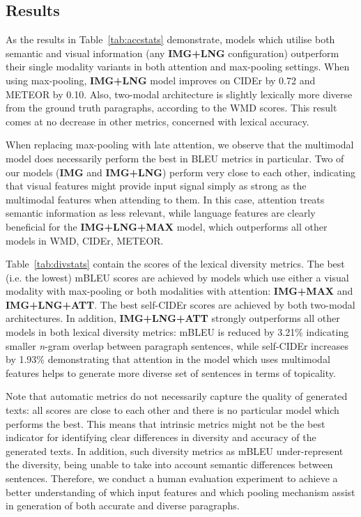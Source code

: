 \documentclass[11pt,a4paper]{article}
\begin{document}
\subsection{Results}

As the results in Table~\ref{tab:accstats} demonstrate, models which utilise both semantic and visual information (any \textbf{IMG+LNG} configuration) outperform their single modality variants in both attention and max-pooling settings.
When using max-pooling, \textbf{IMG+LNG} model improves on CIDEr by 0.72 and METEOR by 0.10.
Also, two-modal architecture is slightly lexically more diverse from the ground truth paragraphs, according to the WMD scores.
This result comes at no decrease in other metrics, concerned with lexical accuracy.

When replacing max-pooling with late attention, we observe that the multimodal model does necessarily perform the best in BLEU metrics in particular.
Two of our models (\textbf{IMG} and \textbf{IMG+LNG}) perform very close to each other, indicating that visual features might provide input signal simply as strong as the multimodal features when attending to them.
In this case, attention treats semantic information as less relevant, while language features are clearly beneficial for the \textbf{IMG+LNG+MAX} model, which outperforms all other models in WMD, CIDEr, METEOR.


Table~\ref{tab:divstats} contain the scores of the lexical diversity metrics. %
The best (i.e. the lowest) mBLEU scores are achieved by models which use either a visual modality with max-pooling or both modalities with attention: \textbf{IMG+MAX} and \textbf{IMG+LNG+ATT}.
The best self-CIDEr scores are achieved by both two-modal architectures.
In addition, \textbf{IMG+LNG+ATT} strongly outperforms all other models in both lexical diversity metrics: mBLEU is reduced by 3.21\% indicating smaller \textit{n}-gram overlap between paragraph sentences, while self-CIDEr increases by 1.93\% demonstrating that attention in the model which uses multimodal features helps to generate more diverse set of sentences in terms of topicality.

Note that automatic metrics do not necessarily capture the quality of generated texts: all scores are close to each other and there is no particular model which performs the best.
This means that intrinsic metrics might not be the best indicator for identifying clear differences in diversity and accuracy of the generated texts.
In addition, such diversity metrics as mBLEU under-represent the diversity, being unable to take into account semantic differences between sentences.
Therefore, we conduct a human evaluation experiment to achieve a better understanding of which input features and which pooling mechanism assist in generation of both accurate and diverse paragraphs.
\end{document}
